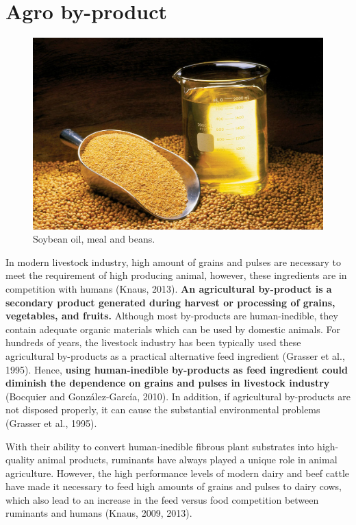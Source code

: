 \documentclass[]{book}
\begin{document}
\section{Agro by-product}\label{agro-by-product}

\begin{figure}

{\centering \includegraphics[width=1\linewidth]{figures/sbm} 

}

\caption{Soybean oil, meal and beans.}\label{fig:sbm}
\end{figure}

In modern livestock industry, high amount of grains and pulses are
necessary to meet the requirement of high producing animal, however,
these ingredients are in competition with humans (Knaus, 2013).
\textbf{An agricultural by-product is a secondary product generated
during harvest or processing of grains, vegetables, and fruits.}
Although most by-products are human-inedible, they contain adequate
organic materials which can be used by domestic animals. For hundreds of
years, the livestock industry has been typically used these agricultural
by-products as a practical alternative feed ingredient (Grasser et al.,
1995). Hence, \textbf{using human-inedible by-products as feed
ingredient could diminish the dependence on grains and pulses in
livestock industry} (Bocquier and González-García, 2010). In addition,
if agricultural by-products are not disposed properly, it can cause the
substantial environmental problems (Grasser et al., 1995).

With their ability to convert human-inedible fibrous plant substrates
into high-quality animal products, ruminants have always played a unique
role in animal agriculture. However, the high performance levels of
modern dairy and beef cattle have made it necessary to feed high amounts
of grains and pulses to dairy cows, which also lead to an increase in
the feed versus food competition between ruminants and humans (Knaus,
2009, 2013).
\end{document}
